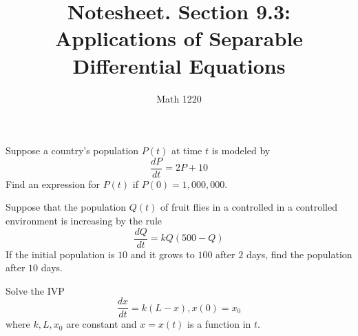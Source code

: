 \documentclass[12pt, a4paper]{article}
\author{Math 1220}
\title{Notesheet. Section 9.3: Applications of Separable Differential Equations}
\date{}
\begin{document}
\maketitle
\nameline
\begin{ex}
  Suppose a country's population \(P(t)\) at time \(t\) is modeled
  by \[
    \frac{dP}{dt} = 2P+10
  \]
  Find an expression for \(P(t)\) if \(P(0)=1,000,000\).
\end{ex}
\begin{ex}
  Suppose that the population \(Q(t)\) of fruit flies in a controlled
  in a controlled environment is increasing by the rule \[
    \frac{dQ}{dt} = kQ(500-Q)
  \]
  If the initial population is \(10\) and it grows to \(100\) after
  \(2\) days, find the population after \(10\) days.
\end{ex}
\pagebreak
\begin{ex}
  Solve the IVP \[
    \frac{dx}{dt} = k(L-x), x(0)=x_0
  \]
  where \(k,L,x_0\) are constant and \(x = x(t)\) is a function in \(t\).
\end{ex}
\end{document}
